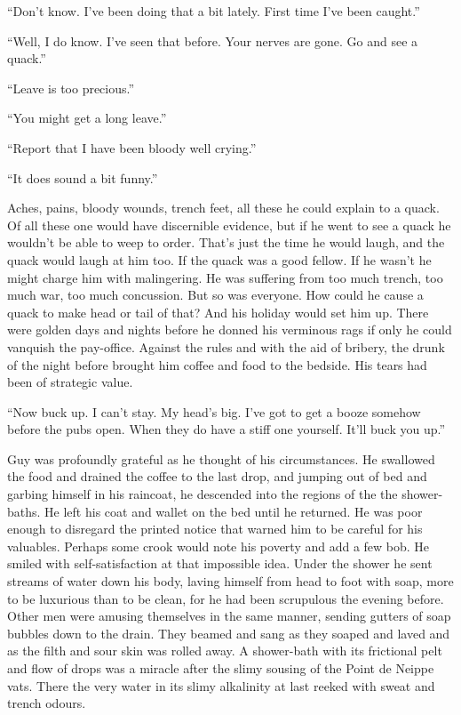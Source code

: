``Don't know. I've been doing that a bit lately. First time I've been caught.''

``Well, I do know. I've seen that before. Your nerves are gone. Go and see a quack.''

``Leave is too precious.''

``You might get a long leave.''

``Report that I have been bloody well crying.''

``It does sound a bit funny.''

Aches, pains, bloody wounds, trench feet, all these he could explain to a quack. Of all these one would have discernible evidence, but if he went to see a quack he wouldn't be able to weep to order. That's just the time he would laugh, and the quack would laugh at him too. If the quack was a good fellow. If he wasn't he might charge him with malingering. He was suffering from too much trench, too much war, too much concussion. But so was everyone. How could he cause a quack to make head or tail of that? And his holiday would set him up. There were golden days and nights before he donned his verminous rags if only he could vanquish the pay-office. Against the rules and with the aid of bribery, the drunk of the night before brought him coffee and food to the bedside. His tears had been of strategic value.

``Now buck up. I can't stay. My head's big. I've got to get a booze somehow before the pubs open. When they do have a stiff one yourself. It'll buck you up.''

Guy was profoundly grateful as he thought of his circumstances. He swallowed the food and drained the coffee to the last drop, and jumping out of bed and garbing himself in his raincoat, he descended into the regions of the the shower-baths. He left his coat and wallet on the bed until he returned. He was poor enough to disregard the printed notice that warned him to be careful for his valuables. Perhaps some crook would note his poverty and add a few bob. He smiled with self-satisfaction at that impossible idea. Under the shower he sent streams of water down his body, laving himself from head to foot with soap, more to be luxurious than to be clean, for he had been scrupulous the evening before. Other men were amusing themselves in the same manner, sending gutters of soap bubbles down to the drain. They beamed and sang as they soaped and laved and as the filth and sour skin was rolled away. A shower-bath with its frictional pelt and flow of drops was a miracle after the slimy sousing of the Point de Neippe vats. There the very water in its slimy alkalinity at last reeked with sweat and trench odours.

